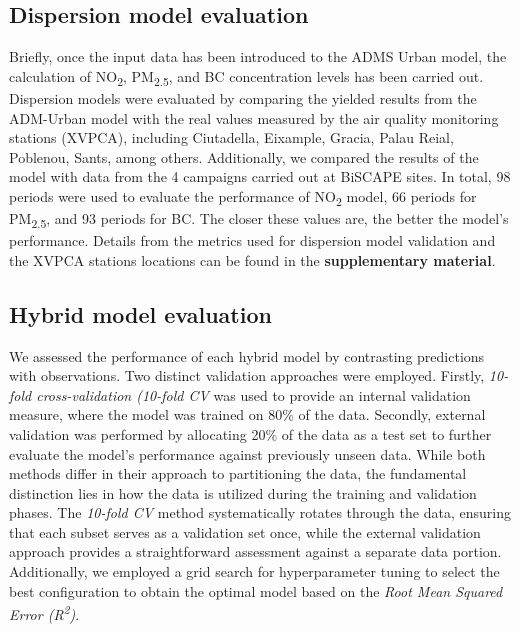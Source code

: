 \documentclass{article}
\begin{document}
\subsection{Dispersion model evaluation}
Briefly, once the input data has been introduced to the ADMS Urban model, the calculation of NO\textsubscript{2}, PM\textsubscript{2.5}, and BC concentration levels has been carried out. Dispersion models were evaluated by comparing the yielded results from the ADM-Urban model with the real values measured by the air quality monitoring stations (XVPCA), including Ciutadella, Eixample, Gracia, Palau Reial, Poblenou, Sants, among others. Additionally, we compared the results of the model with data from the 4 campaigns carried out at BiSCAPE sites. In total, 98 periods were used to evaluate the performance of NO\textsubscript{2} model, 66 periods for PM\textsubscript{2.5}, and 93 periods for BC. The closer these values are, the better the model's performance. Details from the metrics used for dispersion model validation and the XVPCA stations locations can be found in the \textbf{supplementary material}.

\subsection{Hybrid model evaluation}
We assessed the performance of each hybrid model by contrasting predictions with observations. Two distinct validation approaches were employed. Firstly, \textit{10-fold cross-validation (10-fold CV} was used to provide an internal validation measure, where the model was trained on 80\% of the data. Secondly, external validation was performed by allocating 20\% of the data as a test set to further evaluate the model's performance against previously unseen data. While both methods differ in their approach to partitioning the data, the fundamental distinction lies in how the data is utilized during the training and validation phases. The \textit{10-fold CV} method systematically rotates through the data, ensuring that each subset serves as a validation set once, while the external validation approach provides a straightforward assessment against a separate data portion. Additionally, we employed a grid search for hyperparameter tuning to select the best configuration to obtain the optimal model based on the \textit{Root Mean Squared Error (R\textsuperscript{2})}. 
\end{document}
